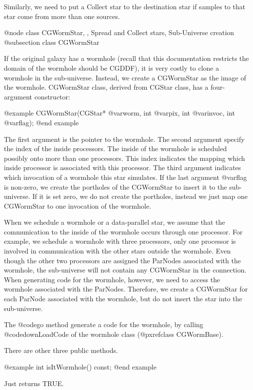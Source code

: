 Similarly, we need to put a Collect star to the destination star if
samples to that star come from more than one sources.

@node class CGWormStar, , Spread and Collect stars, Sub-Universe creation
@subsection class CGWormStar

If the original galaxy has a wormhole (recall that this documentation
restricts the domain of the wormhole should be CGDDF), it is very 
costly to clone a wormhole in the sub-universe. Instead, we create
a CGWormStar as the image of the wormhole. CGWormStar class, derived from
CGStar class, has
a four-argument constructor:

@example
CGWormStar(CGStar* @var{worm}, int @var{pix}, int @var{invoc}, int @var{flag});
@end example

The first argument is the pointer to the wormhole. The second argument
specify the index of the inside processors. The inside of the wormhole
is scheduled possibly onto more than one processors. This index indicates
the mapping which inside processor is associated with this processor.
The third argument indicates which invocation of a wormhole this star
simulates. If the last argument @var{flag} is non-zero, we create
the portholes of the CGWormStar to insert it to the sub-universe.
If it is set zero, we do not create the portholes, instead we just map
one CGWormStar to one invocation of the wormhole. 

When we schedule a wormhole or a data-parallel star, we assume that
the communication to the inside of the wormhole occurs through one
processor. For example, we schedule a wormhole with three processors,
only one processor is involved in communication with the other
stars outside the wormhole. Even though the other two processors are assigned
the ParNodes associated with the wormhole, the sub-universe will not
contain any CGWormStar in the connection. When generating code for the
wormhole, however, we need to access the wormhole associated with the
ParNodes. Therefore, we create a CGWormStar for each ParNode associated with
the wormhole, but do not insert the star into the sub-universe.

The @code{go} method generate a code for the wormhole, by calling
@code{downLoadCode} of the wormhole class (@pxref{class CGWormBase}).

There are other three public methods.

@example
int isItWormhole() const;
@end example

Just returns TRUE.

